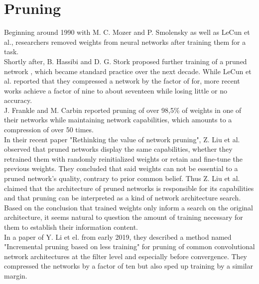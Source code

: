 \section{Pruning}
Beginning around 1990 with M. C. Mozer and P. Smolensky as well as LeCun et al., researchers removed weights from neural networks after training them for a task.\cite{Skeletonization}\cite{Optimal-Brain-Damage}\\  Shortly after, B. Hassibi and D. G. Stork proposed further training of a pruned network \cite{Optimal-Brain-Surgeon}, which became standard practice over the next decade. While LeCun et al. reported that they compressed a network by the factor of for, more recent works achieve a factor of nine to about seventeen while losing little or no accuracy.\cite{Learning_Weights_And_Connections}\cite{ThiNet}\\
J. Frankle and M. Carbin reported pruning of over 98,5\% of weights in one of their networks while maintaining network capabilities, which amounts to a compression of over 50 times.\cite{LTH}\\
In their recent paper "Rethinking the value of network pruning", Z. Liu et al. observed that pruned networks display the same capabilities, whether they retrained them with randomly reinitialized weights or retain and fine-tune the previous weights. They concluded that said weights can not be essential to a pruned network's quality, contrary to prior common belief. Thus Z. Liu et al. claimed that the architecture of pruned networks is responsible for its capabilities and that pruning can be interpreted as a kind of network architecture search.\cite{Rethinking-Network-Pruning}\\
Based on the conclusion that trained weights only inform a search on the original architecture, it seems natural to question the amount of training necessary for them to establish their information content.\\
In a paper of Y. Li et el. from early 2019, they described a method named "Incremental pruning based on less training" for pruning of common convolutional network architectures at the filter level and especially before convergence. They compressed the networks by a factor of ten but also sped up training by a similar margin.\cite{Pruning-With-Little-Training}

